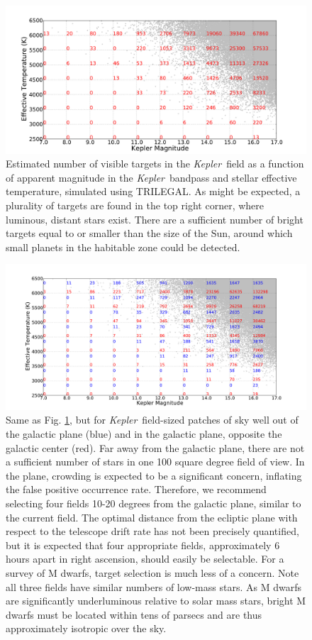 \documentclass[12pt, preprint]{aastex}
\newcommand{\observatory}[1]{\textsl{#1}}
\newcommand{\kepler}{\observatory{Kepler}}
\newcommand{\Kepler}{\kepler}
\begin{document}
\begin{figure}
\includegraphics[width=\textwidth]{KeplerTargets_allT.pdf}
\caption{Estimated number of visible targets in the \Kepler\ field as a 
 function of apparent magnitude in the \Kepler\ bandpass and stellar 
 effective temperature, simulated using TRILEGAL. 
As might be expected, a plurality of targets are found in the top right corner,  where luminous, distant stars exist. 
There are a sufficient number of bright targets equal to or smaller than the size
 of the Sun, around which small planets in the habitable zone could be 
 detected.
}
\label{Fig1}
\end{figure}

\begin{figure}
\includegraphics[width=\textwidth]{KeplerTargets_otherpositions.pdf}
\caption{Same as Fig. \ref{Fig1}, but for \Kepler\ field-sized patches of sky
 well out of the galactic plane (blue) and in the galactic plane, opposite the 
 galactic center (red). 
Far away from the galactic plane, there are not a sufficient number of stars 
 in one 100 square degree field of view. 
In the plane, crowding is expected to be a significant concern, inflating the 
 false positive occurrence rate. 
Therefore, we recommend selecting four fields 10-20 degrees from the galactic 
 plane, similar to the current field. 
The optimal distance from the ecliptic plane with respect to the telescope 
 drift rate has not been precisely quantified, but it is expected that four 
 appropriate fields, approximately 6 hours apart in right ascension, should 
 easily be selectable.
For a survey of M dwarfs, target selection is much less of a concern.
Note all three fields have similar numbers of low-mass stars. 
As M dwarfs are significantly underluminous relative to solar mass stars, 
 bright M dwarfs must be located within tens of parsecs and are thus
 approximately isotropic over the sky.
}
\label{Fig2}
\end{figure}
\end{document}
